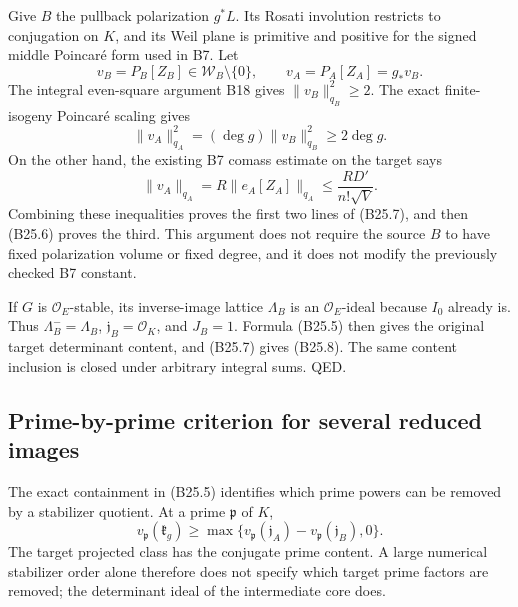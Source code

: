 \documentclass[11pt,a4paper]{article}
\theoremstyle{definition}
\begin{document}
Give \(B\) the pullback polarization \(g^*L\). Its Rosati involution restricts to conjugation on \(K\), and its Weil plane is primitive and positive for the signed middle Poincaré form used in B7. Let \[
 v_B=P_B[Z_B]\in\mathscr W_B\setminus\{0\},
 \qquad v_A=P_A[Z_A]=g_*v_B.
\] The integral even-square argument B18 gives \(\|v_B\|_{q_B}^2\ge2\). The exact finite-isogeny Poincaré scaling gives \[
 \|v_A\|_{q_A}^2=(\deg g)\|v_B\|_{q_B}^2\ge2\deg g.
\] On the other hand, the existing B7 comass estimate on the target says \[
 \|v_A\|_{q_A}=R\|e_A[Z_A]\|_{q_A}
 \le\frac{RD'}{n!\sqrt V}.
\] Combining these inequalities proves the first two lines of (B25.7), and then (B25.6) proves the third. This argument does not require the source \(B\) to have fixed polarization volume or fixed degree, and it does not modify the previously checked B7 constant.

If \(G\) is \(\mathcal O_E\)-stable, its inverse-image lattice \(\Lambda_B\) is an \(\mathcal O_E\)-ideal because \(I_0\) already is. Thus \(\Lambda_B^- =\Lambda_B\), \(\mathfrak j_B=\mathcal O_K\), and \(J_B=1\). Formula (B25.5) then gives the original target determinant content, and (B25.7) gives (B25.8). The same content inclusion is closed under arbitrary integral sums. QED.

\subsection{Prime-by-prime criterion for several reduced images}\label{prime-by-prime-criterion-for-several-reduced-images}

The exact containment in (B25.5) identifies which prime powers can be removed by a stabilizer quotient. At a prime \(\mathfrak p\) of \(K\), \[
 v_{\mathfrak p}(\mathfrak k_g)
 \ge\max\{v_{\mathfrak p}(\mathfrak j_A)
              -v_{\mathfrak p}(\mathfrak j_B),0\}.
\tag{B25.9}
\] The target projected class has the conjugate prime content. A large numerical stabilizer order alone therefore does not specify which target prime factors are removed; the determinant ideal of the intermediate core does.
\end{document}
